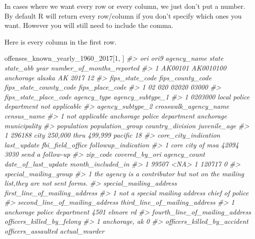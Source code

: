 \documentclass[
  12pt,
]{book}
\newenvironment{Shaded}{\begin{snugshade}}{\end{snugshade}}
\newcommand{\CommentTok}[1]{\textcolor[rgb]{0.56,0.35,0.01}{\textit{#1}}}
\newcommand{\DecValTok}[1]{\textcolor[rgb]{0.00,0.00,0.81}{#1}}
\newcommand{\NormalTok}[1]{#1}
\begin{document}
In cases where we want every row or every column, we just don't put a number. By default R will return every row/column if you don't specify which ones you want. However you will still need to include the comma.

Here is every column in the first row.

\begin{Shaded}
\begin{Highlighting}[]
\NormalTok{offenses\_known\_yearly\_}\DecValTok{1960}\NormalTok{\_}\DecValTok{2017}\NormalTok{[}\DecValTok{1}\NormalTok{, ]}
\CommentTok{\#>       ori      ori9 agency\_name  state state\_abb year number\_of\_months\_reported}
\CommentTok{\#> 1 AK00101 AK0010100   anchorage alaska        AK 2017                        12}
\CommentTok{\#>   fips\_state\_code fips\_county\_code fips\_state\_county\_code fips\_place\_code}
\CommentTok{\#> 1              02              020                  02020           03000}
\CommentTok{\#>   fips\_state\_place\_code             agency\_type agency\_subtype\_1}
\CommentTok{\#> 1               0203000 local police department   not applicable}
\CommentTok{\#>   agency\_subtype\_2       crosswalk\_agency\_name            census\_name}
\CommentTok{\#> 1   not applicable anchorage police department anchorage municipality}
\CommentTok{\#>   population          population\_group country\_division juvenile\_age}
\CommentTok{\#> 1     296188 city 250,000 thru 499,999          pacific           18}
\CommentTok{\#>   core\_city\_indication last\_update fbi\_field\_office followup\_indication}
\CommentTok{\#> 1     core city of msa       42094             3030    send a follow{-}up}
\CommentTok{\#>   zip\_code covered\_by\_ori agency\_count date\_of\_last\_update month\_included\_in}
\CommentTok{\#> 1    99507           <NA>            1              120717                 0}
\CommentTok{\#>                                                              special\_mailing\_group}
\CommentTok{\#> 1 the agency is a contributor but not on the mailing list,they are not sent forms.}
\CommentTok{\#>         special\_mailing\_address first\_line\_of\_mailing\_address}
\CommentTok{\#> 1 not a special mailing address               chief of police}
\CommentTok{\#>   second\_line\_of\_mailing\_address third\_line\_of\_mailing\_address}
\CommentTok{\#> 1    anchorage police department                4501 elmore rd}
\CommentTok{\#>   fourth\_line\_of\_mailing\_address officers\_killed\_by\_felony}
\CommentTok{\#> 1                  anchorage, ak                         0}
\CommentTok{\#>   officers\_killed\_by\_accident officers\_assaulted actual\_murder}

\end{Highlighting}
\end{Shaded}
\end{document}
